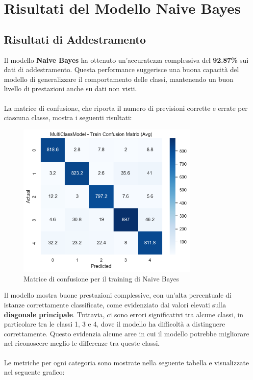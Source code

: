 \section{Risultati del Modello Naive Bayes}

\subsection{Risultati di Addestramento}

Il modello \textbf{Naive Bayes} ha ottenuto un'accuratezza complessiva del \textbf{92.87\%} sui dati di addestramento. Questa performance suggerisce una buona capacità del modello di generalizzare il comportamento delle classi, mantenendo un buon livello di prestazioni anche su dati non visti. \\ \\
La matrice di confusione, che riporta il numero di previsioni corrette e errate per ciascuna classe, mostra i seguenti risultati:

\begin{figure}[H]
    \centering
    \includegraphics[width=0.8\textwidth]{images/confusion_matrix_train_naive_bayes.png}
    \caption{Matrice di confusione per il training di Naive Bayes}
    \label{fig:confusion_matrix_train_naive_bayes}
\end{figure}

Il modello mostra buone prestazioni complessive, con un'alta percentuale di istanze correttamente classificate, come evidenziato dai valori elevati sulla \textbf{diagonale principale}. Tuttavia, ci sono errori significativi tra alcune classi, in particolare tra le classi 1, 3 e 4, dove il modello ha difficoltà a distinguere correttamente. Questo evidenzia alcune aree in cui il modello potrebbe migliorare nel riconoscere meglio le differenze tra queste classi.   \\ \\
Le metriche per ogni categoria sono mostrate nella seguente tabella e visualizzate nel seguente grafico:

